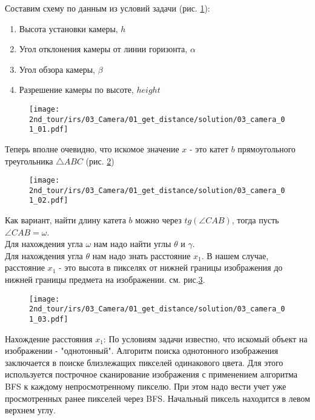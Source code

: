 \solutionSection

Составим схему по данным из условий задачи (рис. \ref{fig:03_camera_01_01}):
\begin{enumerate}
	\item Высота установки камеры, $h$
	\item Угол отклонения камеры от линии горизонта, $\alpha$
	\item Угол обзора камеры, $\beta$
	\item Разрешение камеры по высоте, $height$
\end{enumerate}

\begin{figure}[H]
	\centering
	\texttt{[image: 2nd\_tour/irs/03\_Camera/01\_get\_distance/solution/03\_camera\_01\_01.pdf]}
	\caption{}
	\label{fig:03_camera_01_01}
\end{figure}

Теперь вполне очевидно, что искомое значение $x$ - это катет $b$ прямоугольного треугольника $\triangle ABC$ (рис. \ref{fig:03_camera_01_02})

\begin{figure}[H]
	\centering
	\texttt{[image: 2nd\_tour/irs/03\_Camera/01\_get\_distance/solution/03\_camera\_01\_02.pdf]}
	\caption{}
	\label{fig:03_camera_01_02}
\end{figure}

Как вариант, найти длину катета $b$ можно через $tg(\angle CAB)$, тогда пусть $\angle CAB = \omega$.\\
Для нахождения угла $\omega$ нам надо найти углы $\theta$ и $\gamma$. \\
Для нахождения угла $\theta$ нам надо знать расстояние $x_1$. В нашем случае, расстояние $x_1$ - это высота в пикселях от нижней границы изображения до нижней границы предмета на изображении. см. рис.\ref{fig:03_camera_01_03}.

\begin{figure}[H]
	\centering
	\texttt{[image: 2nd\_tour/irs/03\_Camera/01\_get\_distance/solution/03\_camera\_01\_03.pdf]}
	\caption{}
	\label{fig:03_camera_01_03}
\end{figure}

Нахождение расстояния $x_1$:
По условиям задачи известно, что искомый объект на изображении - "однотонный".
Алгоритм поиска однотонного изображения заключается в поиске близлежащих пикселей одинакового цвета. Для этого используется построчное сканирование изображения с применением алгоритма BFS к каждому непросмотренному пикселю. При этом надо вести учет уже просмотренных ранее пикселей через BFS. Начальный пиксель находится в левом верхнем углу.

